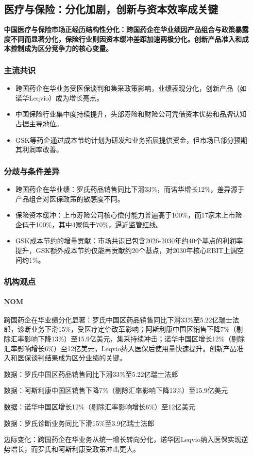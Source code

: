 \documentclass[11pt]{ctexart}
\begin{document}
\subsection{医疗与保险：分化加剧，创新与资本效率成关键}
\textbf{中国医疗与保险市场正经历结构性分化：跨国药企在华业绩因产品组合与政策暴露度不同而显著分化，保险行业则因资本缓冲差距加速两极分化。创新产品准入和成本控制成为区分竞争力的核心变量。}
\subsubsection*{主流共识}
\begin{itemize}
  \item 跨国药企在华业务受医保谈判和集采政策影响，业绩表现分化，创新产品（如诺华Leqvio）成为增长亮点。
  \item 中国保险行业集中度持续提升，头部寿险和财险公司凭借资本优势和品牌认知占据主导地位。
  \item GSK等药企通过成本节约计划为研发和业务拓展提供资金，但市场已部分预期其利润率改善。
\end{itemize}
\subsubsection*{分歧与条件差异}
\begin{itemize}
  \item 跨国药企在华业绩：罗氏药品销售同比下滑33\%，而诺华增长12\%，差异源于产品组合对医保政策的敏感度不同。
  \item 保险资本缓冲：上市寿险公司核心偿付能力普遍高于100\%，而17家未上市险企低于100\%，其中4家低于70\%，逼近监管红线。
  \item GSK成本节约的增量贡献：市场共识已包含2026-2030年约40个基点的利润率提升，GSK额外成本节约仅能再贡献约20个基点，对2030年核心EBIT上调空间约1\%。
\end{itemize}
\subsubsection*{机构观点}
\paragraph{NOM} 跨国药企在华业绩分化显著：罗氏中国区药品销售同比下滑33\%至5.22亿瑞士法郎，诊断业务下滑15\%，受医疗定价改革影响；阿斯利康中国区销售下降7\%（剔除汇率影响下降13\%）至15.9亿美元，集采持续冲击；诺华中国区增长12\%（剔除汇率影响增长6\%）至12亿美元，Leqvio纳入医保后使用量快速提升。创新产品准入和医保谈判结果成为区分业绩的关键。
{\small\color{refgray}数据：罗氏中国区药品销售同比下滑33\%至5.22亿瑞士法郎\par}
{\small\color{refgray}数据：阿斯利康中国区销售下降7\%（剔除汇率影响下降13\%）至15.9亿美元\par}
{\small\color{refgray}数据：诺华中国区增长12\%（剔除汇率影响增长6\%）至12亿美元\par}
{\small\color{refgray}数据：罗氏诊断业务同比下滑15\%至3.9亿瑞士法郎\par}
{\small\color{refgray}边际变化：跨国药企在华业务从统一增长转向分化，诺华因Leqvio纳入医保实现逆势增长，而罗氏和阿斯利康受政策冲击更大。\par}
\end{document}
